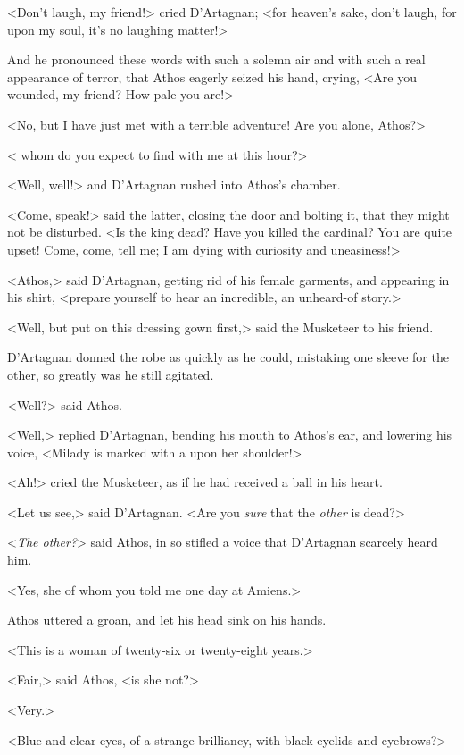 <Don't laugh, my friend!> cried D'Artagnan; <for heaven's sake, don't laugh, for upon my soul, it's no laughing matter!> 

And he pronounced these words with such a solemn air and with such a real appearance of terror, that Athos eagerly seized his hand, crying, <Are you wounded, my friend? How pale you are!> 

<No, but I have just met with a terrible adventure! Are you alone, Athos?> 

< whom do you expect to find with me at this hour?> 

<Well, well!> and D'Artagnan rushed into Athos's chamber. 

<Come, speak!> said the latter, closing the door and bolting it, that they might not be disturbed. <Is the king dead? Have you killed the cardinal? You are quite upset! Come, come, tell me; I am dying with curiosity and uneasiness!> 

<Athos,> said D'Artagnan, getting rid of his female garments, and appearing in his shirt, <prepare yourself to hear an incredible, an unheard-of story.> 

<Well, but put on this dressing gown first,> said the Musketeer to his friend. 

D'Artagnan donned the robe as quickly as he could, mistaking one sleeve for the other, so greatly was he still agitated. 

<Well?> said Athos. 

<Well,> replied D'Artagnan, bending his mouth to Athos's ear, and lowering his voice, <Milady is marked with a  upon her shoulder!> 

<Ah!> cried the Musketeer, as if he had received a ball in his heart. 

<Let us see,> said D'Artagnan. <Are you \emph{sure} that the \emph{other} is dead?> 

<\emph{The other?}> said Athos, in so stifled a voice that D'Artagnan scarcely heard him. 

<Yes, she of whom you told me one day at Amiens.> 

Athos uttered a groan, and let his head sink on his hands. 

<This is a woman of twenty-six or twenty-eight years.> 

<Fair,> said Athos, <is she not?> 

<Very.> 

<Blue and clear eyes, of a strange brilliancy, with black eyelids and eyebrows?> 

